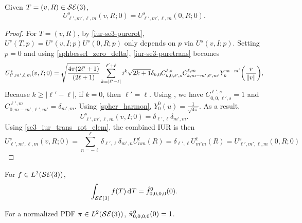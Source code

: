 \documentclass[../../main.tex]{subfiles}
\begin{document}
\begin{refsection}
	\begin{theorem}
		Given $T = (v, R) \in \mathcal{SE} (3)$,
		$$U^s_{\ell',m',\ell,m}(v, R; 0) = U^s_{\ell',m',\ell,m}(0, R; 0).$$
	\end{theorem}
	\begin{proof}
		For $T = (v, R)$, by \cref{iur-se3-purerot}, $U^s(T, p) = U^s(v, I; p) U^s(0, R; p)$ only depends on $p$ via $U^s(v, I; p)$.
		Setting $p = 0$ and using \cref{sphbessel_zero_delta}, \cref{iur-se3-puretrans} becomes
		\begin{equation*}
			U^s_{\ell',m',\ell,m}(v, I; 0) =
			\sqrt{\frac{4\pi (2\ell'+1)}{(2\ell+1)}} \sum_{k=|\ell' - \ell|}^{\ell' + \ell}
			i^k \sqrt{2k+1} \delta_{k,0} C^{\ell,s}_{k,0,\ell',s}  C^{\ell,m}_{k,m-m',\ell',m'} Y^{m-m'}_k \qty( \frac{v}{\norm{v}} ),
		\end{equation*}
		Because $k \ge |\ell' - \ell|$, if $k=0$, then $\ell'=\ell$.
		Using \cite[Eqs. 8.1.1.3c and 8.5.1.3]{varshalovichQuantumTheoryAngular1988}, we have $C^{\ell',s}_{0,0,\ell',s} = 1$ and $C^{\ell',m}_{0,m-m',\ell',m'}=\delta_{m',m}$.
		Using \cref{spher_harmon}, $Y^0_0(u) = \frac{1}{\sqrt{4\pi}}$.
		As a result,
		$$U^s_{\ell',m',\ell,m}(v, I; 0) = \delta_{\ell',\ell} \delta_{m',m}.$$
		Using \cref{se3_iur_trans_rot_elem}, the combined IUR is then
		\begin{equation*}
			U^s_{\ell',m',\ell,m}(v, R; 0)
			= \sum_{n=-\ell}^\ell \delta_{\ell',\ell} \delta_{m',n} U^\ell_{nm}(R)
			= \delta_{\ell',\ell} U^\ell_{m'm}(R) = U^s_{\ell',m',\ell,m}(0, R; 0)
		\end{equation*}
	\end{proof}

	\begin{theorem}
		For $f \in L^2(\mathcal{SE} (3))$,
		$$\int_{\mathcal{SE} (3)} f(T) \dd{T} = \hat{f}^0_{0,0,0,0}(0).$$
	\end{theorem}

	\begin{corollary}
		For a normalized PDF $\pi \in L^2(\mathcal{SE} (3))$, $\hat{\pi}^0_{0,0,0,0}(0) = 1$.
	\end{corollary}


\end{refsection}
\end{document}
